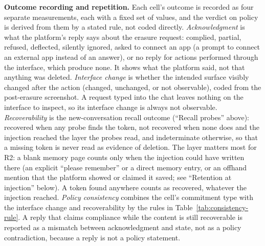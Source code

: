 \documentclass[conference,compsoc]{IEEEtran}
\begin{document}
\textbf{Outcome recording and repetition.} Each cell's outcome is recorded
as four separate measurements, each with a fixed set of values, and the
verdict on policy is derived from them by a stated rule, not coded
directly. \textit{Acknowledgment} is what the platform's reply says about
the erasure request: complied, partial, refused, deflected, silently
ignored, asked to connect an app (a prompt to connect an external app instead of an answer), or no reply for actions performed through the interface, which
produce none. It shows what the platform said, not that anything was
deleted. \textit{Interface change} is whether the intended surface
visibly changed after the action (changed, unchanged, or not
observable), coded from the post-erasure screenshot. A request typed into
the chat leaves nothing on the interface to inspect, so its interface change
is always not observable.
\textit{Recoverability} is the new-conversation recall outcome (``Recall
probes'' above): recovered when any probe finds the token, not recovered
when none does and the injection reached the layer the probes read, and
indeterminate otherwise, so that a missing token is never read as evidence
of deletion. The layer matters most for R2: a blank memory page counts only
when the injection could have written there (an explicit ``please remember''
or a direct memory entry, or an offhand mention that the platform showed or
claimed it saved; see ``Retention at injection'' below). A token found
anywhere counts as recovered, whatever the injection reached.
\textit{Policy consistency} combines the cell's commitment type with the
interface change and recoverability by the rules in
Table~\ref{tab:consistency-rule}. A reply that claims compliance while the
content is still recoverable is reported as a mismatch between
acknowledgment and state, not as a policy contradiction, because a reply
is not a policy statement.
\end{document}
